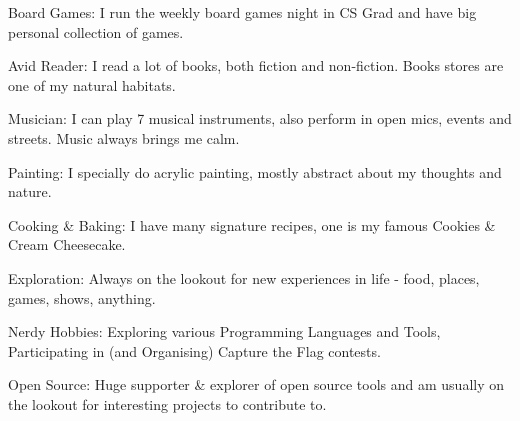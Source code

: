 


\begin{cventries}
  \cventry
    {}
    {}
    {}
    {}
    {
      \vspace{-4.0mm}
      \begin{cvitems}
          \item Board Games: I run the weekly board games night in CS Grad and have big personal collection of games.
          \item Avid Reader: I read a lot of books, both fiction and non-fiction. Books stores are one of my natural habitats.
          \item Musician: I can play 7 musical instruments, also perform in open mics, events and streets. Music always brings me calm.
          \item Painting: I specially do acrylic painting, mostly abstract about my thoughts and nature.
          \item Cooking \& Baking: I have many signature recipes, one is my famous Cookies \& Cream Cheesecake.
          \item Exploration: Always on the lookout for new experiences in life - food, places, games, shows, anything.
          \item Nerdy Hobbies: Exploring various Programming Languages and Tools, Participating in (and Organising) Capture the Flag contests.
          \item Open Source: Huge supporter \& explorer of open source tools and am usually on the lookout for interesting projects to contribute to.
      \end{cvitems}
    }
\end{cventries}
